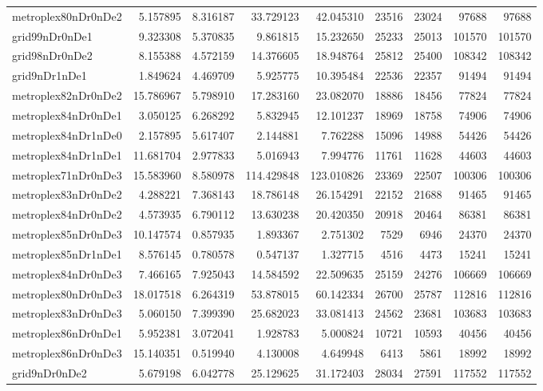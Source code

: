 \begin{longtable}{|l|r|r|r|r|r|r|r|r|}
metroplex80nDr0nDe2 & 5.157895 & 8.316187 & 33.729123 & 42.045310 & 23516 & 23024 & 97688 & 97688 \\
grid99nDr0nDe1 & 9.323308 & 5.370835 & 9.861815 & 15.232650 & 25233 & 25013 & 101570 & 101570 \\
grid98nDr0nDe2 & 8.155388 & 4.572159 & 14.376605 & 18.948764 & 25812 & 25400 & 108342 & 108342 \\
grid9nDr1nDe1 & 1.849624 & 4.469709 & 5.925775 & 10.395484 & 22536 & 22357 & 91494 & 91494 \\
metroplex82nDr0nDe2 & 15.786967 & 5.798910 & 17.283160 & 23.082070 & 18886 & 18456 & 77824 & 77824 \\
metroplex84nDr0nDe1 & 3.050125 & 6.268292 & 5.832945 & 12.101237 & 18969 & 18758 & 74906 & 74906 \\
metroplex84nDr1nDe0 & 2.157895 & 5.617407 & 2.144881 & 7.762288 & 15096 & 14988 & 54426 & 54426 \\
metroplex84nDr1nDe1 & 11.681704 & 2.977833 & 5.016943 & 7.994776 & 11761 & 11628 & 44603 & 44603 \\
metroplex71nDr0nDe3 & 15.583960 & 8.580978 & 114.429848 & 123.010826 & 23369 & 22507 & 100306 & 100306 \\
metroplex83nDr0nDe2 & 4.288221 & 7.368143 & 18.786148 & 26.154291 & 22152 & 21688 & 91465 & 91465 \\
metroplex84nDr0nDe2 & 4.573935 & 6.790112 & 13.630238 & 20.420350 & 20918 & 20464 & 86381 & 86381 \\
metroplex85nDr0nDe3 & 10.147574 & 0.857935 & 1.893367 & 2.751302 & 7529 & 6946 & 24370 & 24370 \\
metroplex85nDr1nDe1 & 8.576145 & 0.780578 & 0.547137 & 1.327715 & 4516 & 4473 & 15241 & 15241 \\
metroplex84nDr0nDe3 & 7.466165 & 7.925043 & 14.584592 & 22.509635 & 25159 & 24276 & 106669 & 106669 \\
metroplex80nDr0nDe3 & 18.017518 & 6.264319 & 53.878015 & 60.142334 & 26700 & 25787 & 112816 & 112816 \\
metroplex83nDr0nDe3 & 5.060150 & 7.399390 & 25.682023 & 33.081413 & 24562 & 23681 & 103683 & 103683 \\
metroplex86nDr0nDe1 & 5.952381 & 3.072041 & 1.928783 & 5.000824 & 10721 & 10593 & 40456 & 40456 \\
metroplex86nDr0nDe3 & 15.140351 & 0.519940 & 4.130008 & 4.649948 & 6413 & 5861 & 18992 & 18992 \\
grid9nDr0nDe2 & 5.679198 & 6.042778 & 25.129625 & 31.172403 & 28034 & 27591 & 117552 & 117552 \\

\end{longtable}
